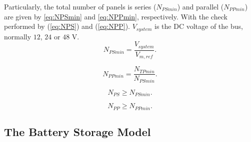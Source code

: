 \documentclass[journal]{IEEEtran}
\begin{document}
Particularly, the total number of panels is series ($N_{PSmin}$) and parallel ($N_{PPmin}$) are given by \eqref{eq:NPSmin} and \eqref{eq:NPPmin}, respectively. With the check performed by (\ref{eq:NPS}) and (\ref{eq:NPP}). $ V_{system} $ is the DC voltage of the bus, normally $12$, $24$ or $48$ V.
\begin{equation}
\label{eq:NPSmin}
N_{PSmin} = \dfrac{V_{system}}{V_{m,ref}}.
\end{equation}

\begin{equation}
\label{eq:NPPmin}
N_{PPmin} = \dfrac{N_{TPmin}}{N_{PSmin}}.
\end{equation}

\begin{equation}
\label{eq:NPS}
N_{PS} \geq N_{PSmin}.
\end{equation}

\begin{equation}
\label{eq:NPP}
N_{PP} \geq N_{PPmin}.
\end{equation}

\subsection{The Battery Storage Model }

  
\end{document}
